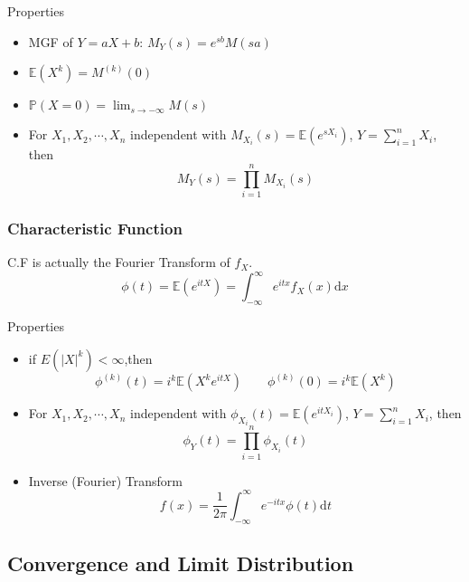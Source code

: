     Properties
    \begin{itemize}
        \item MGF of $Y=aX+b$: $
            M_Y(s)=e^{sb}M(sa)    $
        \item $\mathbb{E}(X^k)=M^{(k)}(0)$
        \item $\mathbb{P}(X=0)={\displaystyle\lim_{s\to -\infty}}M(s)$
        \item For $X_1,X_2,\cdots,X_n$ independent with $M_{X_i}(s)=\mathbb{E}(e^{sX_i})$, $Y={\displaystyle \sum_{i=1}^n} X_i$, then
        \begin{equation}    
            M_Y(s)=\prod_{i=1}^n M_{X_i}(s)
        \end{equation}
    \end{itemize}
\subsubsection{Characteristic Function}
    C.F is actually the Fourier Transform of $f_X$.
    \begin{equation}
        \phi(t)=\mathbb{E}(e^{itX}) = \int_{-\infty}^\infty e^{itx}f_X(x)\mathrm{d}x
    \end{equation}

    Properties
    \begin{itemize}
    \item if $E(|X|^k)<\infty$,then
    \begin{equation}
        \phi^{(k)}(t)=i^k\mathbb{E}(X^ke^{itX})\qquad \phi^{(k)}(0)=i^k\mathbb{E}(X^k)    
    \end{equation}
    \item For $X_1,X_2,\cdots,X_n$ independent with $\phi_{X_i}(t)=\mathbb{E}(e^{itX_i})$, $Y={\displaystyle \sum_{i=1}^n} X_i$, then
    \begin{equation}
        \phi_Y(t)=\prod_{i=1}^n \phi_{X_i}(t)
    \end{equation}
    \item Inverse (Fourier) Transform
    \begin{equation}
        f(x)=\frac{1}{2\pi}\int_{-\infty}^\infty e^{-itx}\phi(t)\mathrm{d}t    
    \end{equation}
\end{itemize}



\subsection{Convergence and Limit Distribution}
